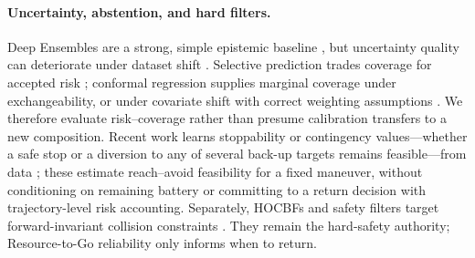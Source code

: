\paragraph{Uncertainty, abstention, and hard filters.}
Deep Ensembles are a strong, simple epistemic baseline \citep{lakshminarayanan2017ensembles}, but uncertainty quality can deteriorate under dataset shift \citep{ovadia2019uncertainty}. Selective prediction trades coverage for accepted risk \citep{geifman2019selectivenet}; conformal regression supplies marginal coverage under exchangeability, or under covariate shift with correct weighting assumptions \citep{romano2019cqr,tibshirani2019covshift}. We therefore evaluate risk--coverage rather than presume calibration transfers to a new composition. Recent work learns stoppability or contingency values---whether a safe stop or a diversion to any of several back-up targets remains feasible---from data \citep{long2026stoppability,lishkova2026contingencies}; these estimate reach--avoid feasibility for a fixed maneuver, without conditioning on remaining battery or committing to a return decision with trajectory-level risk accounting. Separately, HOCBFs and safety filters target forward-invariant collision constraints \citep{xiao2022hocbf,lavanakul2024safetyfilters}. They remain the hard-safety authority; Resource-to-Go reliability only informs when to return.
